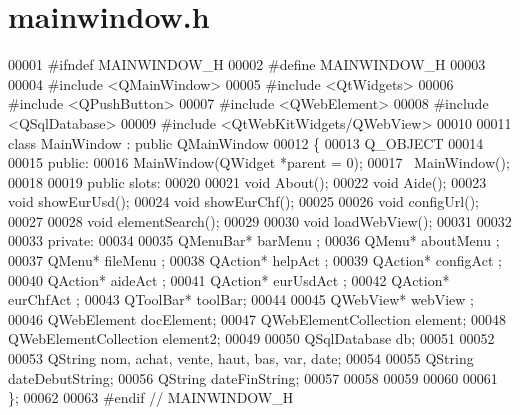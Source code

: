 \section{mainwindow.\-h}

\begin{DoxyCode}
00001 \textcolor{preprocessor}{#ifndef MAINWINDOW\_H}
00002 \textcolor{preprocessor}{}\textcolor{preprocessor}{#define MAINWINDOW\_H}
00003 \textcolor{preprocessor}{}
00004 \textcolor{preprocessor}{#include <QMainWindow>}
00005 \textcolor{preprocessor}{#include <QtWidgets>}
00006 \textcolor{preprocessor}{#include <QPushButton>}
00007 \textcolor{preprocessor}{#include <QWebElement>}
00008 \textcolor{preprocessor}{#include <QSqlDatabase>}
00009 \textcolor{preprocessor}{#include <QtWebKitWidgets/QWebView>}
00010 
00011 \textcolor{keyword}{class }MainWindow : \textcolor{keyword}{public} QMainWindow
00012 \{
00013     Q\_OBJECT
00014 
00015 \textcolor{keyword}{public}:
00016     MainWindow(QWidget *parent = 0);
00017     ~MainWindow();
00018 
00019 \textcolor{keyword}{public} slots:
00020 
00021     \textcolor{keywordtype}{void}        About();
00022     \textcolor{keywordtype}{void}        Aide();
00023     \textcolor{keywordtype}{void}        showEurUsd();
00024     \textcolor{keywordtype}{void}        showEurChf();
00025 
00026     \textcolor{keywordtype}{void}        configUrl();
00027 
00028     \textcolor{keywordtype}{void}        elementSearch();
00029 
00030     \textcolor{keywordtype}{void}        loadWebView();
00031 
00032 
00033 \textcolor{keyword}{private}:
00034 
00035     QMenuBar*           barMenu ;
00036     QMenu*              aboutMenu ;
00037     QMenu*              fileMenu ;
00038     QAction*            helpAct ;
00039     QAction*            configAct ;
00040     QAction*            aideAct ;
00041     QAction*            eurUsdAct ;
00042     QAction*            eurChfAct ;
00043     QToolBar*           toolBar;
00044 
00045     QWebView*           webView ;
00046     QWebElement         docElement;
00047     QWebElementCollection element;
00048     QWebElementCollection element2;
00049 
00050     QSqlDatabase            db;
00051 
00052 
00053     QString nom, achat, vente, haut, bas, var, date;
00054 
00055     QString dateDebutString;
00056     QString dateFinString;
00057 
00058 
00059 
00060 
00061 \};
00062 
00063 \textcolor{preprocessor}{#endif // MAINWINDOW\_H}
\end{DoxyCode}
